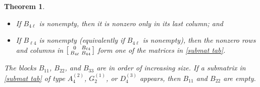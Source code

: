\documentclass{amsart}
\newtheorem{theorem}[proposition]{Theorem}
\theoremstyle{definition}
\theoremstyle{remark}
\numberwithin{equation}{section}
\newcommand{\0}{{\mathbf{0}}}
\begin{document}
\begin{theorem}
\begin{enumerate}[\quad\rm(i)]
\begin{itemize}
\item
If $B_{4\ell}$ is nonempty, then it is nonzero only in its last column; and
\item
If $B_{\ell4}$ is nonempty (equivalently if $B_{4\ell}$ is nonempty), then the nonzero rows and columns in $\begin{bsmallmatrix} 0 & B_{\ell4} \\ B_{4\ell} & B_{44} \end{bsmallmatrix}$ form one of the matrices in \cref{submat tab}.
\end{itemize}
The blocks $B_{11}$, $B_{22}$, and $B_{33}$ are in order of increasing size. 
If a submatrix in \cref{submat tab} of type $A_{4}^{(2)}$, $G_{2}^{(1)}$, or $D_{4}^{(3)}$ appears, then $B_{11}$ and $B_{22}$ are empty.
\end{enumerate}
\end{theorem}
\end{document}
